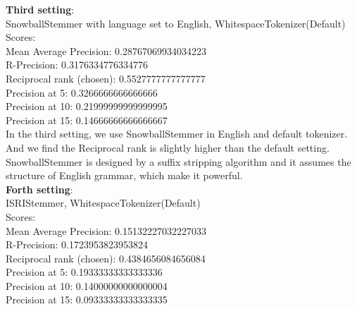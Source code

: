 \documentclass{article}
\begin{document}



\noindent
\textbf{Third setting}:\\
SnowballStemmer with language set to English, WhitespaceTokenizer(Default)\\
Scores:\\
Mean Average Precision: 0.28767069934034223\\
R-Precision: 0.3176334776334776\\
Reciprocal rank (chosen): 0.5527777777777777\\
Precision at 5: 0.3266666666666666\\
Precision at 10: 0.21999999999999995\\
Precision at 15: 0.14666666666666667\\

In the third setting, we use SnowballStemmer in English and default tokenizer. 
And we find the Reciprocal rank is slightly higher than the default setting. 
SnowballStemmer is designed by a suffix stripping algorithm and it assumes 
the structure of English grammar, which make it powerful.\\

\noindent
\textbf{Forth setting}:\\
ISRIStemmer, WhitespaceTokenizer(Default)\\
Scores:\\
Mean Average Precision: 0.15132227032227033\\
R-Precision: 0.1723953823953824\\
Reciprocal rank (chosen): 0.4384656084656084\\
Precision at 5: 0.19333333333333336\\
Precision at 10: 0.14000000000000004\\
Precision at 15: 0.09333333333333335\\
\end{document}
